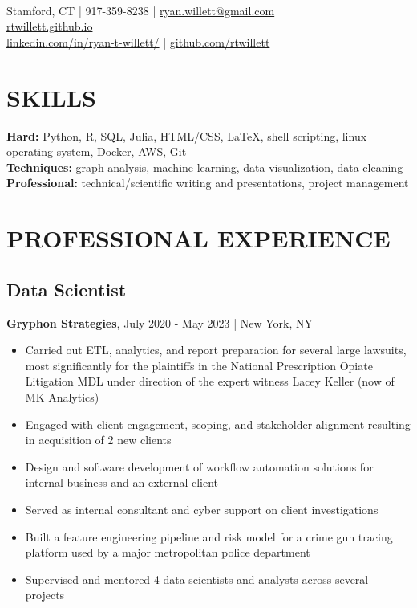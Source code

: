 \documentclass[11pt]{article}
\title{\vspace{-7cm}}
\date{}
\author{Ryan Willett}
\newenvironment{myitemize}
{ \begin{itemize}
	\setlength{\itemsep}{0pt}
	\setlength{\parskip}{0pt}
	\setlength{\parsep}{0pt}     }
{ \end{itemize}                  }
\begin{document}
\maketitle

\section*{}
  \\
\normalsize
Stamford, CT | 917-359-8238 | \href{mailto:ryan.willett@gmail.com}{ryan.willett@gmail.com} \\
\href{http://rtwillett.github.io}{rtwillett.github.io} \\
\href{https://linkedin.com/in/ryan-t-willett/}{linkedin.com/in/ryan-t-willett/} | \href{https://github.com/rtwillett}{github.com/rtwillett}

\raggedright

\section*{SKILLS}
{\bfseries Hard:} Python, R, SQL, Julia, HTML/CSS, \LaTeX, shell scripting, linux operating system, Docker, AWS, Git \\
{\bfseries Techniques:} graph analysis, machine learning, data visualization, data cleaning \\
{\bfseries Professional:} technical/scientific writing and presentations, project management

\section*{PROFESSIONAL EXPERIENCE}
\subsection*{Data Scientist}
{\bfseries Gryphon Strategies}, July 2020 - May 2023 | New York, NY
\begin{myitemize}
	\item Carried out ETL, analytics, and report preparation for several large lawsuits, most
	significantly for the plaintiffs in the National Prescription Opiate Litigation MDL under
	direction of the expert witness Lacey Keller (now of MK Analytics)
	\item Engaged with client engagement, scoping, and stakeholder alignment resulting in
	acquisition of 2 new clients
	\item Design and software development of workflow automation solutions for internal business
	and an external client
	\item Served as internal consultant and cyber support on client investigations
	\item Built a feature engineering pipeline and risk model for a crime gun tracing platform used
	by a major metropolitan police department
	\item Supervised and mentored 4 data scientists and analysts across several projects
\end{myitemize}
\end{document}
